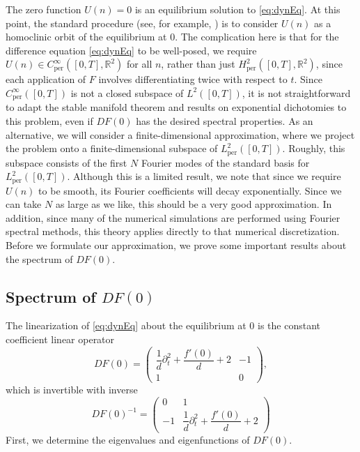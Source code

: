 \documentclass[12pt,reqno]{amsart}
\def\R{{\mathbb R}}
\def\per{\textrm{per}}
\theoremstyle{definition}
\begin{document}
The zero function $U(n) = 0$ is an equilibrium solution to \cref{eq:dynEq}. At this point, the standard procedure (see, for example, \cites{Parker2021,Parker2020,Sandstede1998}) is to consider $U(n)$ as a homoclinic orbit of the equilibrium at 0. The complication here is that for the difference equation \cref{eq:dynEq} to be well-posed, we require $U(n) \in C_\per^\infty([0,T],\R^2)$ for all $n$, rather than just $H^2_\per([0,T], \R^2)$, since each application of $F$ involves differentiating twice with respect to $t$. Since $C_\per^\infty([0,T])$ is not a closed subspace of $L^2([0,T])$, it is not straightforward to adapt the stable manifold theorem and results on exponential dichotomies to this problem, even if $DF(0)$ has the desired spectral properties. As an alternative, we will consider a finite-dimensional approximation, where we project the problem onto a finite-dimensional subspace of $L_\per^2([0,T])$. Roughly, this subspace consists of the first $N$ Fourier modes of the standard basis for $L_\per^2([0,T])$. Although this is a limited result, we note that since we require $U(n)$ to be smooth, its Fourier coefficients will decay exponentially. Since we can take $N$ as large as we like, this should be a very good approximation. In addition, since many of the numerical simulations are performed using Fourier spectral methods, this theory applies directly to that numerical discretization. Before we formulate our approximation, we prove some important results about the spectrum of $DF(0)$.

\subsection{Spectrum of \texorpdfstring{$DF(0)$}{DF(0)}}

The linearization of \cref{eq:dynEq} about the equilibrium at 0 is the constant coefficient linear operator 
\begin{equation}\label{eq:DF0}
DF(0) = \begin{pmatrix}
\dfrac{1}{d}\partial_t^2 + \dfrac{f'(0)}{d} + 2 & -1 \\ 1 & 0
\end{pmatrix},
\end{equation}
which is invertible with inverse
\begin{equation}\label{eq:DF0inv}
DF(0)^{-1} = \begin{pmatrix}
0 & 1 \\ -1 & \dfrac{1}{d}\partial_t^2 + \dfrac{f'(0)}{d} + 2
\end{pmatrix}
\end{equation}
First, we determine the eigenvalues and eigenfunctions of $DF(0)$.
\end{document}
